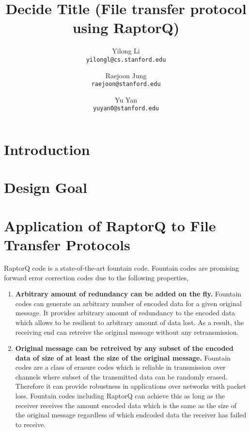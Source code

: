\documentclass{sig-alternate-10pt}
\begin{document}
\title{Decide Title (File transfer protocol using RaptorQ)}
\author{
  Yilong Li\\
  \texttt{yilongl@cs.stanford.edu}
  \and 
  Raejoon Jung\\
  \texttt{raejoon@stanford.edu}
  \and
  Yu Yan\\
  \texttt{yuyan0@stanford.edu}
}

\maketitle
\section{Introduction}

\section{Design Goal}

\section{Application of RaptorQ to File Transfer Protocols}
RaptorQ code is a state-of-the-art fountain code. Fountain codes are promising
forward error correction codes due to the following properties,
\begin{enumerate}[label=(\alph*)]
  \item \textbf{Arbitrary amount of redundancy can be added on the fly.}
  Fountain codes can generate an arbitrary number of encoded data for a given
  original message. It provides arbitrary amount of redundancy to the encoded
  data which allows to be resilient to arbitrary amount of data lost. As a
  result, the receiving end can retreive the original message without any
  retransmission.

  \item \textbf{Original message can be retreived by any subset of the encoded
  data of size of at least the size of the original message.} 
  Fountain codes are a class of erasure codes which is reliable in transmission
  over channels where subset of the transmitted data can be randomly erased.
  Therefore it can provide robustness in applications over networks with packet
  loss. Fountain codes including RaptorQ can achieve this as long as the
  receiver receives the amount encoded data which is the same as the size of the
  original message regardless of which endcoded data the receiver has failed to
  receive.   
\end{enumerate}
\end{document}

